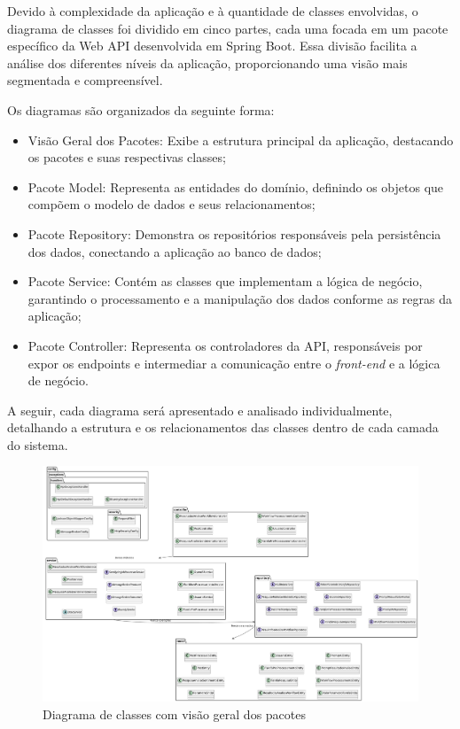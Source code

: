 \documentclass[
	12pt,				%
	oneside,			%
	a4paper,			%
	english,			%
	french,				%
	spanish,			%
	brazil				%
	]{abntex2}
\begin{document}
Devido à complexidade da aplicação e à quantidade de classes envolvidas,
o diagrama de classes foi dividido em cinco partes, cada uma focada em
um pacote específico da Web API desenvolvida em Spring Boot. Essa
divisão facilita a análise dos diferentes níveis da aplicação,
proporcionando uma visão mais segmentada e compreensível.

Os diagramas são organizados da seguinte forma:

\begin{itemize}
\tightlist
\item
  Visão Geral dos Pacotes: Exibe a estrutura principal da aplicação,
  destacando os pacotes e suas respectivas classes;
\item
  Pacote Model: Representa as entidades do domínio, definindo os objetos
  que compõem o modelo de dados e seus relacionamentos;
\item
  Pacote Repository: Demonstra os repositórios responsáveis pela
  persistência dos dados, conectando a aplicação ao banco de dados;
\item
  Pacote Service: Contém as classes que implementam a lógica de negócio,
  garantindo o processamento e a manipulação dos dados conforme as
  regras da aplicação;
\item
  Pacote Controller: Representa os controladores da API, responsáveis
  por expor os endpoints e intermediar a comunicação entre o
  \emph{front-end} e a lógica de negócio.
\end{itemize}

A seguir, cada diagrama será apresentado e analisado individualmente,
detalhando a estrutura e os relacionamentos das classes dentro de cada
camada do sistema.

\begin{figure}[htbp]
\hypertarget{diagrama_classe_geral}{%
\caption{Diagrama de classes com visão geral dos pacotes}\label{diagrama_classe_geral}
\begin{center}
\includegraphics[scale=0.2]{imagens/sentilytics/diagramas/classes/diagrama-classe-visao-geral-pacotes.png}
\end{center}
}
\end{figure}
\end{document}
